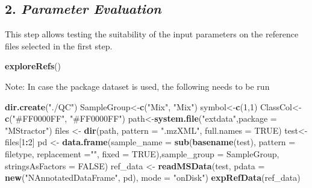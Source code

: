 \documentclass[
]{article}
\newenvironment{Shaded}{\begin{snugshade}}{\end{snugshade}}
\newcommand{\DataTypeTok}[1]{\textcolor[rgb]{0.13,0.29,0.53}{#1}}
\newcommand{\DecValTok}[1]{\textcolor[rgb]{0.00,0.00,0.81}{#1}}
\newcommand{\KeywordTok}[1]{\textcolor[rgb]{0.13,0.29,0.53}{\textbf{#1}}}
\newcommand{\NormalTok}[1]{#1}
\newcommand{\OperatorTok}[1]{\textcolor[rgb]{0.81,0.36,0.00}{\textbf{#1}}}
\newcommand{\OtherTok}[1]{\textcolor[rgb]{0.56,0.35,0.01}{#1}}
\newcommand{\StringTok}[1]{\textcolor[rgb]{0.31,0.60,0.02}{#1}}
\begin{document}
\hypertarget{parameter-evaluation}{%
\subsection{\texorpdfstring{2. \emph{Parameter
Evaluation}}{2. Parameter Evaluation}}\label{parameter-evaluation}}

This step allows testing the suitability of the input parameters on the
reference files selected in the first step.

\begin{Shaded}
\begin{Highlighting}[]
\KeywordTok{exploreRefs}\NormalTok{() }
\end{Highlighting}
\end{Shaded}

Note: In case the package dataset is used, the following needs to be run

\begin{Shaded}
\begin{Highlighting}[]
\KeywordTok{dir.create}\NormalTok{(}\StringTok{"./QC"}\NormalTok{)}
\NormalTok{SampleGroup<{-}}\KeywordTok{c}\NormalTok{(}\StringTok{"Mix"}\NormalTok{, }\StringTok{"Mix"}\NormalTok{)}
\NormalTok{symbol<{-}}\KeywordTok{c}\NormalTok{(}\DecValTok{1}\NormalTok{,}\DecValTok{1}\NormalTok{)}
\NormalTok{ClassCol<{-}}\KeywordTok{c}\NormalTok{(}\StringTok{"\#FF0000FF"}\NormalTok{, }\StringTok{"\#FF0000FF"}\NormalTok{)}
\NormalTok{path<{-}}\KeywordTok{system.file}\NormalTok{(}\StringTok{"extdata"}\NormalTok{,}\DataTypeTok{package =} \StringTok{"MStractor"}\NormalTok{)}
\NormalTok{files <{-}}\StringTok{ }\KeywordTok{dir}\NormalTok{(path, }\DataTypeTok{pattern =} \StringTok{".mzXML"}\NormalTok{, }\DataTypeTok{full.names =} \OtherTok{TRUE}\NormalTok{)}
\NormalTok{test<{-}files[}\DecValTok{1}\OperatorTok{:}\DecValTok{2}\NormalTok{]}
\NormalTok{pd <{-}}\StringTok{ }\KeywordTok{data.frame}\NormalTok{(}\DataTypeTok{sample\_name =} \KeywordTok{sub}\NormalTok{(}\KeywordTok{basename}\NormalTok{(test), }\DataTypeTok{pattern =}\NormalTok{ filetype,}
    \DataTypeTok{replacement =}\StringTok{""}\NormalTok{, }\DataTypeTok{fixed =} \OtherTok{TRUE}\NormalTok{),}\DataTypeTok{sample\_group =}\NormalTok{ SampleGroup,}
    \DataTypeTok{stringsAsFactors =} \OtherTok{FALSE}\NormalTok{)}
\NormalTok{ref\_data <{-}}\StringTok{ }\KeywordTok{readMSData}\NormalTok{(test, }\DataTypeTok{pdata =} \KeywordTok{new}\NormalTok{(}\StringTok{"NAnnotatedDataFrame"}\NormalTok{,}
\NormalTok{    pd), }\DataTypeTok{mode =} \StringTok{"onDisk"}\NormalTok{)}
\KeywordTok{expRefData}\NormalTok{(ref\_data)}
\end{Highlighting}
\end{Shaded}
\end{document}
